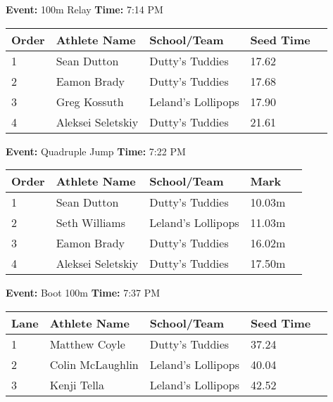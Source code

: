 \documentclass[11pt]{article}
\begin{document}
\textbf{Event:} 100m Relay \quad \textbf{Time:} 7:14 PM 

\vspace{1em}
\begin{tabular}{@{}lllll@{}}
\toprule

\textbf{Order} & \textbf{Athlete Name} & \textbf{School/Team} & \textbf{Seed Time} \\
\midrule
1 & Sean Dutton & Dutty's Tuddies & 17.62 &\\
2 & Eamon Brady & Dutty's Tuddies & 17.68 &\\
3 & Greg Kossuth & Leland's Lollipops & 17.90 &\\
4 & Aleksei Seletskiy & Dutty's Tuddies & 21.61 &\\
\bottomrule
\end{tabular}
\vspace{2.5em}


\textbf{Event:} Quadruple Jump \quad \textbf{Time:} 7:22 PM 

\vspace{1em}
\begin{tabular}{@{}lllll@{}}
\toprule

\textbf{Order} & \textbf{Athlete Name} & \textbf{School/Team} & \textbf{Mark} \\
\midrule
1 & Sean Dutton & Dutty's Tuddies & 10.03m &\\
2 & Seth Williams & Leland's Lollipops & 11.03m &\\
3 & Eamon Brady & Dutty's Tuddies & 16.02m &\\
4 & Aleksei Seletskiy & Dutty's Tuddies & 17.50m &\\
\bottomrule
\end{tabular}
\vspace{2.5em}


\textbf{Event:} Boot 100m \quad \textbf{Time:} 7:37 PM 

\vspace{1em}
\begin{tabular}{@{}lllll@{}}
\toprule

\textbf{Lane} & \textbf{Athlete Name} & \textbf{School/Team} & \textbf{Seed Time} \\
\midrule
1 & Matthew Coyle & Dutty's Tuddies & 37.24 &\\
2 & Colin McLaughlin & Leland's Lollipops & 40.04 &\\
3 & Kenji Tella & Leland's Lollipops & 42.52 &\\
\bottomrule
\end{tabular}
\vspace{2.5em}
\end{document}
